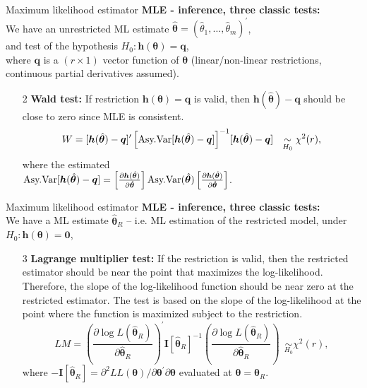 \documentclass{beamer}
\begin{document}
\begin{frame}{Maximum likelihood estimator}
\textbf{MLE - inference, three classic tests:}\\ \bigskip
We have an unrestricted ML estimate $\hat{\bm{\theta}}=(\hat{\theta}_1, \dots, \hat{\theta}_m)^{\prime}$,\\
and test of the hypothesis $H_0 : \bm{h}(\bm{\theta}) = \bm{q}$,\\
where $\bm{q}$ is a $(r \times 1)$ vector function of $\bm{\theta}$ (linear/non-linear restrictions, continuous partial derivatives assumed).
\bigskip
\begin{itemize}
    \item[2] \textbf{Wald test:} If restriction $\bm{h}(\bm{\theta}) = \bm{q}$ is valid, then $\bm{h}(\hat{\bm{\theta}})-\bm{q}$ should be close to zero since MLE is consistent.\\
    $$
    W = [\bm{h}(\hat{\bm{\theta}})-\bm{q}]^{\prime}
    \left[  \textnormal{Asy.Var} [\bm{h}(\hat{\bm{\theta}})-\bm{q}]
    \right]^{-1} \! [\bm{h}(\hat{\bm{\theta}})-\bm{q}]
    ~~\underset{H_0}{\sim} \chi^2(r),
    $$
    where the estimated\\ $\textnormal{Asy.Var} [\bm{h}(\hat{\bm{\theta}})-\bm{q}]
    = \left[ \frac{\partial \bm{h}(\hat{\bm{\theta}})}{\partial \hat{\bm{\theta}}} 
    \right] \textnormal{Asy.Var}(\hat{\bm{\theta}})
    \left[ \frac{\partial \bm{h}(\hat{\bm{\theta}})}{\partial \hat{\bm{\theta}}} 
    \right]$.
\end{itemize}
\end{frame}
\begin{frame}{Maximum likelihood estimator}
\textbf{MLE - inference, three classic tests:}\\ \bigskip
We have a ML estimate $\hat{\bm{\theta}}_R$ -- i.e. ML estimation of the restricted model, under $H_0 : \bm{h}(\bm{\theta}) = \bm{0}$,\\ \medskip
\begin{itemize}
    \item[3] \textbf{Lagrange multiplier test:} If the restriction is valid, then the restricted estimator should be near the point that maximizes the log-likelihood. Therefore, the slope of the log-likelihood function should be near zero at the restricted estimator. The test is based on the slope of the log-likelihood at the point where the function is maximized subject to the restriction.\\ \smallskip
    $$
    \textit{LM} = 
    \left( \frac{\partial \log L(\hat{\bm{\theta}}_R)}{\partial \hat{\bm{\theta}}_R} \right)^{\prime}
    \bm{I}[\hat{\bm{\theta}}_R]^{-1}
    \left( \frac{\partial \log L(\hat{\bm{\theta}}_R)}{\partial \hat{\bm{\theta}}_R} \right)
    ~~\underset{H_0}{\sim} \chi^2(r),
    $$
    where $-\bm{I}[\hat{\bm{\theta}}_R]= \partial^2 LL(\bm{\theta}) / \partial \bm{\theta}^{\prime} \partial \bm{\theta}$ evaluated at $\bm{\theta}=\hat{\bm{\theta}}_R$.
\end{itemize}

\end{frame}
\end{document}
